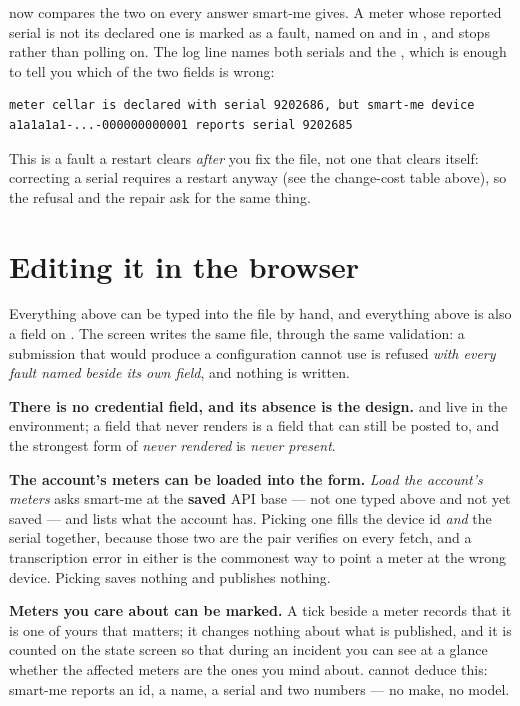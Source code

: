 \prog now compares the two on every answer smart-me gives. A meter whose reported serial is
not its declared one is marked as a fault, named on \code{/} and in ,
and stops rather than polling on. The log line names both serials and the ,
which is enough to tell you which of the two fields is wrong:

\begin{lstlisting}
meter cellar is declared with serial 9202686, but smart-me device
a1a1a1a1-...-000000000001 reports serial 9202685
\end{lstlisting}

\begin{note}
This is a fault a restart clears \emph{after} you fix the file, not one that clears itself:
correcting a serial requires a restart anyway (see the change-cost table above), so the
refusal and the repair ask for the same thing.
\end{note}

\section{Editing it in the browser}

Everything above can be typed into the file by hand, and everything above is also a field on
. The screen writes the same file, through the same validation: a submission that
would produce a configuration \prog cannot use is refused \emph{with every fault named beside
its own field}, and nothing is written.

\begin{note}
\textbf{There is no credential field, and its absence is the design.} 
and  live in the environment; a field that never renders is a
field that can still be posted to, and the strongest form of \emph{never rendered} is
\emph{never present}.
\end{note}

\textbf{The account's meters can be loaded into the form.} \emph{Load the account's meters}
asks smart-me at the \textbf{saved} API base --- not one typed above and not yet saved --- and
lists what the account has. Picking one fills the device id \emph{and} the serial together,
because those two are the pair \prog verifies on every fetch, and a transcription error in
either is the commonest way to point a meter at the wrong device. Picking saves nothing and
publishes nothing.

\textbf{Meters you care about can be marked.} A tick beside a meter records that it is one of
yours that matters; it changes nothing about what is published, and it is counted on the state
screen so that during an incident you can see at a glance whether the affected meters are the
ones you mind about. \prog cannot deduce this: smart-me reports an id, a name, a serial and two
numbers --- no make, no model.

